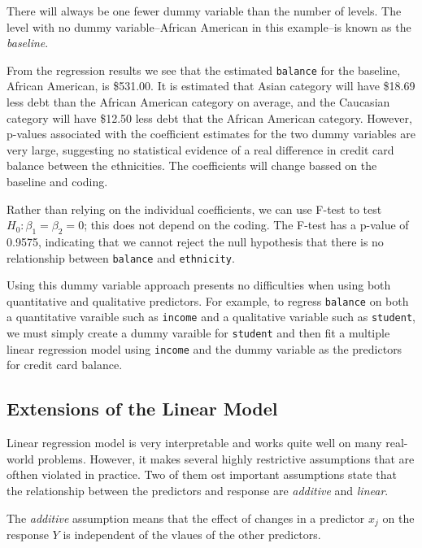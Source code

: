 \documentclass[
  letterpaper,
  DIV=11,
  numbers=noendperiod]{scrreprt}
\begin{document}
There will always be one fewer dummy variable than the number of levels.
The level with no dummy variable--African American in this example--is
known as the \emph{baseline}.

From the regression results we see that the estimated \texttt{balance}
for the baseline, African American, is \$531.00. It is estimated that
Asian category will have \$18.69 less debt than the African American
category on average, and the Caucasian category will have \$12.50 less
debt that the African American category. However, p-values associated
with the coefficient estimates for the two dummy variables are very
large, suggesting no statistical evidence of a real difference in credit
card balance between the ethnicities. The coefficients will change
bassed on the baseline and coding.

Rather than relying on the individual coefficients, we can use F-test to
test \(H_0 : \beta_1 = \beta_2 = 0\); this does not depend on the
coding. The F-test has a p-value of 0.9575, indicating that we cannot
reject the null hypothesis that there is no relationship between
\texttt{balance} and \texttt{ethnicity}.

Using this dummy variable approach presents no difficulties when using
both quantitative and qualitative predictors. For example, to regress
\texttt{balance} on both a quantitative varaible such as \texttt{income}
and a qualitative variable such as \texttt{student}, we must simply
create a dummy varaible for \texttt{student} and then fit a multiple
linear regression model using \texttt{income} and the dummy variable as
the predictors for credit card balance.

\hypertarget{extensions-of-the-linear-model}{%
\subsection{Extensions of the Linear
Model}\label{extensions-of-the-linear-model}}

Linear regression model is very interpretable and works quite well on
many real-world problems. However, it makes several highly restrictive
assumptions that are ofthen violated in practice. Two of them ost
important assumptions state that the relationship between the predictors
and response are \emph{additive} and \emph{linear}.

The \emph{additive} assumption means that the effect of changes in a
predictor \(x_j\) on the response \(Y\) is independent of the vlaues of
the other predictors.
\end{document}
